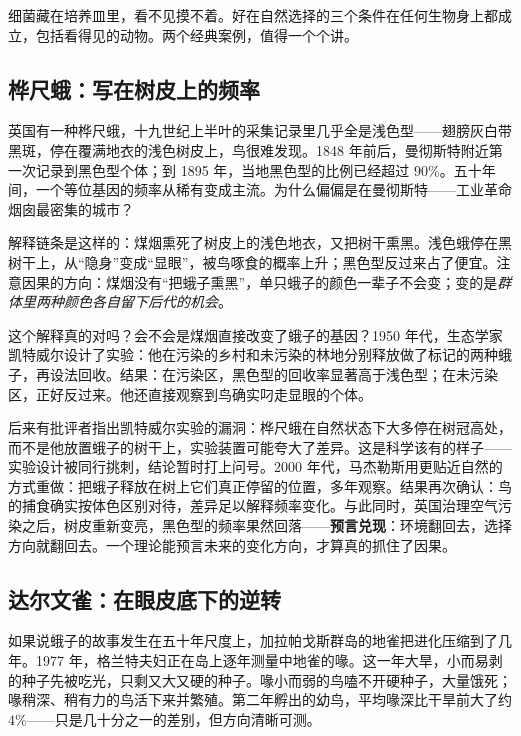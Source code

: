 细菌藏在培养皿里，看不见摸不着。好在自然选择的三个条件在任何生物身上都成立，包括看得见的动物。两个经典案例，值得一个个讲。

\subsection{桦尺蛾：写在树皮上的频率}

英国有一种桦尺蛾，十九世纪上半叶的采集记录里几乎全是浅色型——翅膀灰白带黑斑，停在覆满地衣的浅色树皮上，鸟很难发现。1848 年前后，曼彻斯特附近第一次记录到黑色型个体；到 1895 年，当地黑色型的比例已经超过 $90\%$。五十年间，一个等位基因的频率从稀有变成主流。为什么偏偏是在曼彻斯特——工业革命烟囱最密集的城市？

解释链条是这样的：煤烟熏死了树皮上的浅色地衣，又把树干熏黑。浅色蛾停在黑树干上，从“隐身”变成“显眼”，被鸟啄食的概率上升；黑色型反过来占了便宜。注意因果的方向：煤烟没有“把蛾子熏黑”，单只蛾子的颜色一辈子不会变；变的是\emph{群体里两种颜色各自留下后代的机会}。

\begin{zhengju}
这个解释真的对吗？会不会是煤烟直接改变了蛾子的基因？1950 年代，生态学家凯特威尔设计了实验：他在污染的乡村和未污染的林地分别释放做了标记的两种蛾子，再设法回收。结果：在污染区，黑色型的回收率显著高于浅色型；在未污染区，正好反过来。他还直接观察到鸟确实叼走显眼的个体。

后来有批评者指出凯特威尔实验的漏洞：桦尺蛾在自然状态下大多停在树冠高处，而不是他放置蛾子的树干上，实验装置可能夸大了差异。这是科学该有的样子——实验设计被同行挑刺，结论暂时打上问号。2000 年代，马杰勒斯用更贴近自然的方式重做：把蛾子释放在树上它们真正停留的位置，多年观察。结果再次确认：鸟的捕食确实按体色区别对待，差异足以解释频率变化。与此同时，英国治理空气污染之后，树皮重新变亮，黑色型的频率果然回落——\textbf{预言兑现}：环境翻回去，选择方向就翻回去。一个理论能预言未来的变化方向，才算真的抓住了因果。
\end{zhengju}

\subsection{达尔文雀：在眼皮底下的逆转}

如果说蛾子的故事发生在五十年尺度上，加拉帕戈斯群岛的地雀把进化压缩到了几年。1977 年，格兰特夫妇正在岛上逐年测量中地雀的喙。这一年大旱，小而易剥的种子先被吃光，只剩又大又硬的种子。喙小而弱的鸟嗑不开硬种子，大量饿死；喙稍深、稍有力的鸟活下来并繁殖。第二年孵出的幼鸟，平均喙深比干旱前大了约 $4\%$——只是几十分之一的差别，但方向清晰可测。

